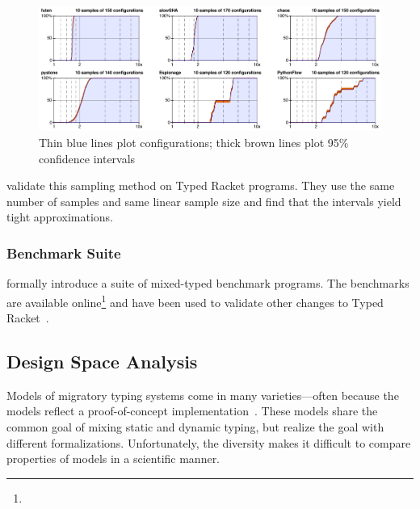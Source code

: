 \begin{figure}[t]
  \includegraphics[width=\columnwidth]{src/sampling.png}
  \caption{Thin blue lines plot  configurations; thick brown lines plot 95\% confidence intervals}
  \label{fig:sampling}
\end{figure}

\citet{gtnffvf-jfp-2019} validate this sampling method on Typed Racket
 programs.
They use the same number of samples and same linear sample size and find
 that the intervals yield tight approximations.



\subsubsection{Benchmark Suite}

\citet{gtnffvf-jfp-2019} formally introduce a suite of mixed-typed benchmark
 programs.
The benchmarks are available online\footnote{}
 and have been used to validate other changes to Typed Racket~\cite{gf-icfp-2018,bbst-oopsla-2017}.


\subsection{Design Space Analysis}

Models of migratory typing systems come in many varieties---often because
 the models reflect a proof-of-concept implementation~\cite{bat-ecoop-2014,rtsf-sac-2013,rsfbv-popl-2015,acftd-scp-2013,cvgrl-oopsla-2017,mmi-dls-2015,bdt-esop-2016,wnlov-popl-2010,mt-oopsla-2017,vss-popl-2017,tf-popl-2008,clzv-ecoop-2018}.
These models share the common goal of mixing static and dynamic typing,
 but realize the goal with different formalizations.
Unfortunately, the diversity makes it difficult to compare properties of
 models in a scientific manner.

